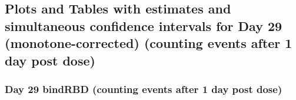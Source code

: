 \documentclass[]{article}
\begin{document}
\clearpage
\clearpage

\hypertarget{plots-and-tables-with-estimates-and-simultaneous-confidence-intervals-for-day-29-monotone-corrected-counting-events-after-1-day-post-dose}{%
\subsection{Plots and Tables with estimates and simultaneous confidence
intervals for Day 29 (monotone-corrected) (counting events after 1 day
post
dose)}\label{plots-and-tables-with-estimates-and-simultaneous-confidence-intervals-for-day-29-monotone-corrected-counting-events-after-1-day-post-dose}}

\clearpage

\hypertarget{day-29-bindrbd-counting-events-after-1-day-post-dose-2}{%
\subsubsection{Day 29 bindRBD (counting events after 1 day post
dose)}\label{day-29-bindrbd-counting-events-after-1-day-post-dose-2}}
\end{document}
